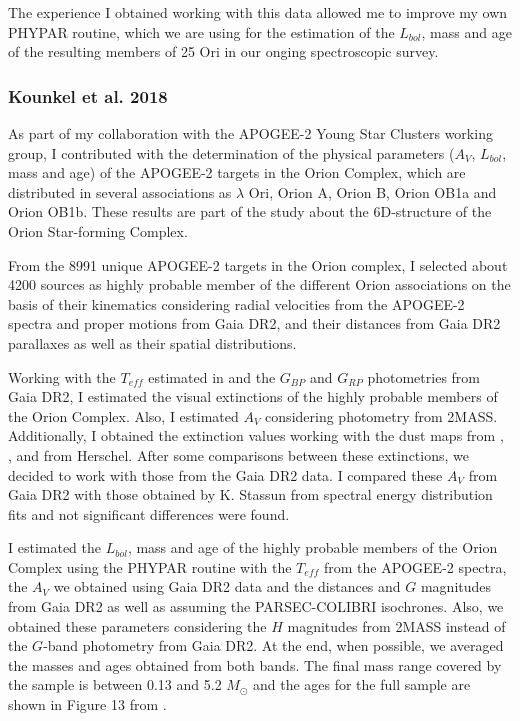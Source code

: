 \documentclass[12pt]{article}
\begin{document}
The experience I obtained working with this data allowed me to improve my own PHYPAR routine, which we are using for the estimation of the $L_{bol}$, mass and age of the resulting members of 25 Ori in our onging spectroscopic survey.

\subsubsection{Kounkel et al. 2018}
\label{sec:Kounkel}
As part of my collaboration with the APOGEE-2 Young Star Clusters working group, I contributed with the determination of the physical parameters ($A_V$, $L_{bol}$, mass and age) of the APOGEE-2 targets in the Orion Complex, which are distributed in several associations as $\lambda$ Ori, Orion A, Orion B, Orion OB1a and Orion OB1b. These results are part of the \citet{Kounkel2018} study about the 6D-structure of the Orion Star-forming Complex.

From the 8991 unique APOGEE-2 targets in the Orion complex, I selected about 4200 sources as highly probable member of the different Orion associations on the basis of their kinematics considering radial velocities from the APOGEE-2 spectra \citep{Kounkel2018} and proper motions from Gaia DR2, and their distances from Gaia DR2 parallaxes as well as their spatial distributions.

Working with the $T_{eff}$ estimated in \citet{Kounkel2018} and the $G_{BP}$ and $G_{RP}$ photometries from Gaia DR2, I estimated the visual extinctions of the highly probable members of the Orion Complex. Also, I estimated $A_V$ considering photometry from 2MASS. Additionally, I obtained the extinction values working with the dust maps from \citet{Schlegel1998}, \citet{Gontcharov2017}, \citet{Green2018} and from Herschel. After some comparisons between these extinctions, we decided to work with those from the Gaia DR2 data. I compared these $A_V$ from Gaia DR2 with those obtained by K. Stassun from spectral energy distribution fits and not significant differences were found.

I estimated the $L_{bol}$, mass and age of the highly probable members of the Orion Complex using the PHYPAR routine with the $T_{eff}$ from the APOGEE-2 spectra, the $A_V$ we obtained using Gaia DR2 data and the distances and $G$ magnitudes from Gaia DR2 as well as assuming the PARSEC-COLIBRI isochrones. Also, we obtained these parameters considering the $H$ magnitudes from 2MASS instead of the $G$-band photometry from Gaia DR2. At the end, when possible, we averaged the masses and ages obtained from both bands. The final mass range covered by the sample is between 0.13 and 5.2 $M_\odot$ and the ages for the full sample are shown in Figure 13 from \citet{Kounkel2018}. 
\end{document}
